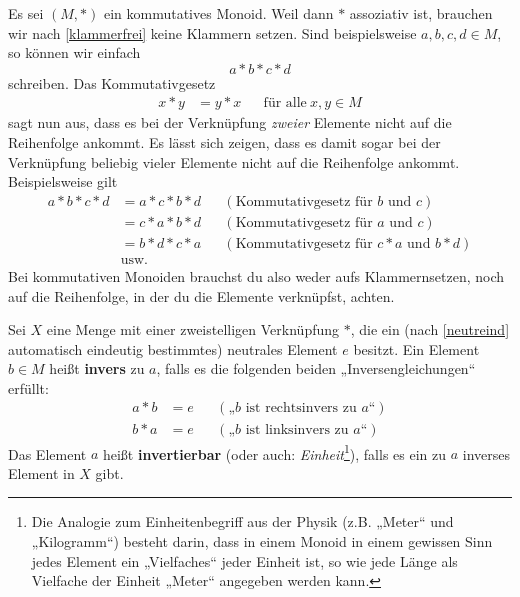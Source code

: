 \begin{bem}
    Es sei $(M,*)$ ein kommutatives Monoid. Weil dann $*$ assoziativ ist, brauchen wir nach \cref{klammerfrei} keine Klammern setzen. Sind beispielsweise $a,b,c,d\in M$, so können wir einfach
        \[ a*b*c*d \]
    schreiben. Das Kommutativgesetz
    \begin{align*}
        x*y&=y*x && \text{für alle}\ x,y\in M
    \end{align*}
    sagt nun aus, dass es bei der Verknüpfung \emph{zweier} Elemente nicht auf die Reihenfolge ankommt. Es lässt sich zeigen, dass es damit sogar bei der Verknüpfung beliebig vieler Elemente nicht auf die Reihenfolge ankommt. Beispielsweise gilt
    \begin{align*}
        a*b*c*d & = a*c*b*d && (\text{Kommutativgesetz für $b$ und $c$}) \\
        & = c*a*b*d && (\text{Kommutativgesetz für $a$ und $c$}) \\
        & = b*d*c*a && (\text{Kommutativgesetz für $c*a$ und $b*d$}) \\
        & \text{usw.}
    \end{align*}
    Bei kommutativen Monoiden brauchst du also weder aufs Klammernsetzen, noch auf die Reihenfolge, in der du die Elemente verknüpfst, achten.
\end{bem}


\begin{de} \label{def:inverse}  
    Sei $X$ eine Menge mit einer zweistelligen Verknüpfung $*$, die ein (nach \cref{neutreind} automatisch eindeutig bestimmtes) neutrales Element $e$ besitzt. Ein Element $b\in M$ heißt \textbf{invers} zu $a$, falls es die folgenden beiden „Inversengleichungen“ erfüllt:
    \begin{align*}
        a*b & = e && (\text{„$b$ ist rechtsinvers zu $a$“}) \\
        b*a & = e && (\text{„$b$ ist linksinvers zu $a$“})
    \end{align*}
    Das Element $a$ heißt \textbf{invertierbar} (oder auch: \emph{Einheit}\footnote{Die Analogie zum Einheitenbegriff aus der Physik (z.B. „Meter“ und „Kilogramm“) besteht darin, dass in einem Monoid in einem gewissen Sinn jedes Element ein „Vielfaches“ jeder Einheit ist, so wie jede Länge als Vielfache der Einheit „Meter“ angegeben werden kann.}), falls es ein zu $a$ inverses Element in $X$ gibt.
\end{de}


